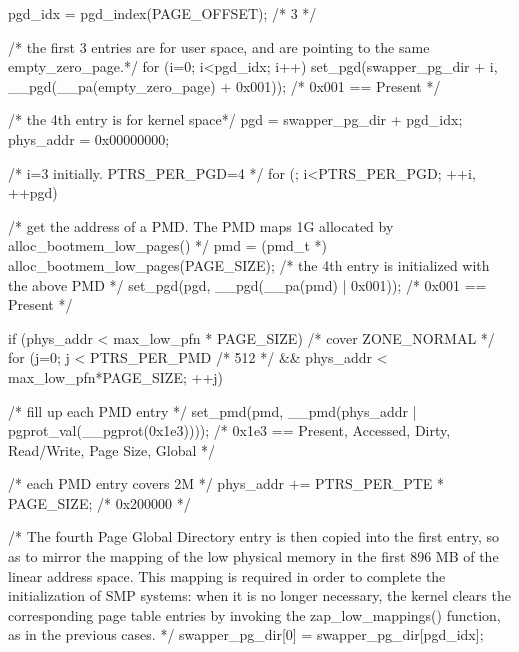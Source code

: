 \documentclass[varwidth=45em,crop]{standalone}
\begin{document}
\begin{ccode}
pgd_idx = pgd_index(PAGE_OFFSET); /* 3 */

/* the first 3 entries are for user space, and are pointing to the same empty_zero_page.*/
for (i=0; i<pgd_idx; i++)
  set_pgd(swapper_pg_dir + i, __pgd(__pa(empty_zero_page) + 0x001)); /* 0x001 == Present */

/* the 4th entry is for kernel space*/
pgd = swapper_pg_dir + pgd_idx;
phys_addr = 0x00000000;

/* i=3 initially. PTRS_PER_PGD=4 */
for (; i<PTRS_PER_PGD; ++i, ++pgd) {
  /* get the address of a PMD.
     The PMD maps 1G allocated by alloc_bootmem_low_pages() */
  pmd = (pmd_t *) alloc_bootmem_low_pages(PAGE_SIZE);
  /* the 4th entry is initialized with the above PMD */
  set_pgd(pgd, __pgd(__pa(pmd) | 0x001)); /* 0x001 == Present */
  
  if (phys_addr < max_low_pfn * PAGE_SIZE) /* cover ZONE_NORMAL */
    for (j=0; j < PTRS_PER_PMD /* 512 */
      && phys_addr < max_low_pfn*PAGE_SIZE; ++j) {
      /* fill up each PMD entry */
      set_pmd(pmd, __pmd(phys_addr | pgprot_val(__pgprot(0x1e3))));
      /* 0x1e3 == Present, Accessed, Dirty, Read/Write,
         Page Size, Global */

      /* each PMD entry covers 2M */
      phys_addr += PTRS_PER_PTE * PAGE_SIZE; /* 0x200000 */
    }
 }

/* The fourth Page Global Directory entry is then copied into the first entry, so as to
   mirror the mapping of the low physical memory in the first 896 MB of the linear address
   space. This mapping is required in order to complete the initialization of SMP systems:
   when it is no longer necessary, the kernel clears the corresponding page table entries
   by invoking the zap_low_mappings() function, as in the previous cases. */
swapper_pg_dir[0] = swapper_pg_dir[pgd_idx];
\end{ccode}
\end{document}
